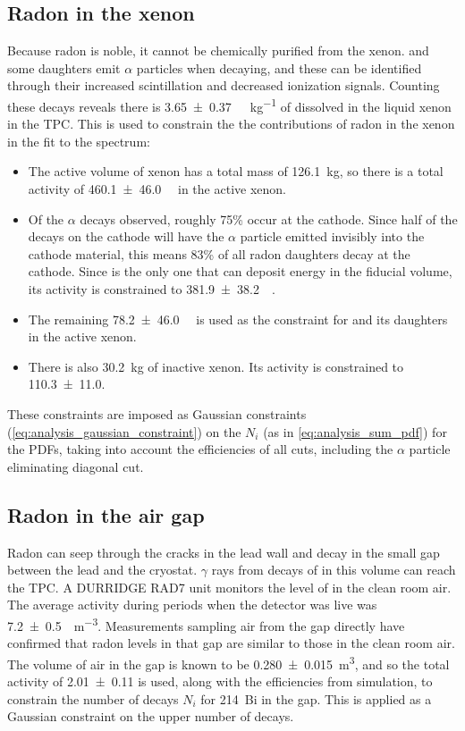\documentclass[herrin-thesis.tex]{subfiles}
\begin{document}
\subsection{Radon in the xenon}
Because radon is noble, it cannot be chemically purified from the xenon.  and some daughters emit \(\alpha\) particles when decaying, and these can be identified through their increased scintillation and decreased ionization signals. Counting these decays reveals there is \SI{3.65\pm0.37}{\micro\Bq\per\kg} of  dissolved in the liquid xenon in the TPC. This is used to constrain the the contributions of radon in the xenon in the fit to the spectrum:
\begin{itemize}
\item The active volume of xenon has a total mass of \SI{126.1}{\kg}, so there is a total activity of \SI{460.1\pm46.0}{\micro\Bq} in the active xenon.
\item Of the  \(\alpha\) decays observed, roughly 75\% occur at the cathode. Since half of the decays on the cathode will have the \(\alpha\) particle emitted invisibly into the cathode material, this means 83\% of all radon daughters decay at the cathode. Since  is the only one that can deposit energy in the fiducial volume, its activity is constrained to \SI{381.9\pm38.2}{\micro\Bq}.
\item The remaining \SI{78.2\pm46.0}{\micro\Bq} is used as the constraint for  and its daughters in the active xenon.
\item There is also \SI{30.2}{\kg} of inactive xenon. Its activity is constrained to \SI{110.3\pm11.0}{\Bq}.
\end{itemize}
These constraints are imposed as Gaussian constraints (\cref{eq:analysis_gaussian_constraint}) on the \(N_i\) (as in \cref{eq:analysis_sum_pdf}) for the PDFs, taking into account the efficiencies of all cuts, including the \(\alpha\) particle eliminating diagonal cut.

\subsection{Radon in the air gap}
Radon can seep through the cracks in the lead wall and decay in the small gap between the lead and the cryostat. \(\gamma\) rays from decays of  in this volume can reach the TPC. A DURRIDGE RAD7 unit monitors the level of  in the clean room air. The average activity during periods when the detector was live was \SI{7.2\pm0.5}{\Bq\per\cubic\meter}. Measurements sampling air from the gap directly have confirmed that radon levels in that gap are similar to those in the clean room air. The volume of air in the gap is known to be \SI{.280\pm0.015}{\cubic\meter}, and so the total activity of \SI{2.01\pm 0.11}{\Bq} is used, along with the efficiencies from simulation, to constrain the number of decays \(N_i\) for \SI{214}{Bi} in the gap. This is applied as a Gaussian constraint on the upper number of decays.
\end{document}
